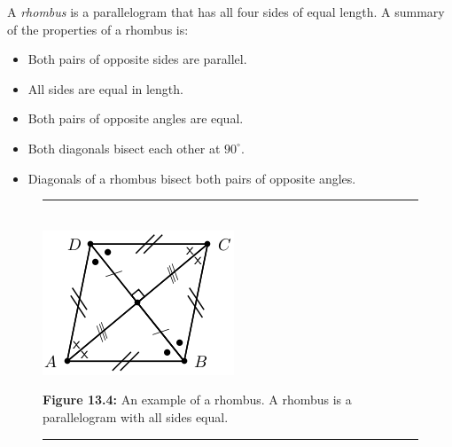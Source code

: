           
          \label{m39354*id319041}A \textsl{rhombus} is a parallelogram that has all four sides of equal length. A summary of the properties of a rhombus is:\par 
          \label{m39354*id319051}\begin{itemize}[noitemsep]
            \label{m39354*uid70}\item Both pairs of opposite sides are parallel.
\label{m39354*uid71}\item All sides are equal in length.
\label{m39354*uid72}\item Both pairs of opposite angles are equal.
\label{m39354*uid73}\item Both diagonals bisect each other at \begin{math}{90}^{\circ }\end{math}.
\label{m39354*uid74}\item Diagonals of a rhombus bisect both pairs of opposite angles.
\end{itemize}
        
          
    \setcounter{subfigure}{0}


	\begin{figure}[H] %
    \begin{center}
    \rule[.1in]{\figurerulewidth}{.005in} \\
        \label{m39354*uid75!!!underscore!!!media}\label{m39354*uid75!!!underscore!!!printimage}\includegraphics{col11306.imgs/m39354_MG10C13_043.png} %
        
      \vspace{2pt}
    \vspace{\rubberspace}\par \begin{cnxcaption}
	  \small \textbf{Figure 13.4: }An example of a rhombus. A rhombus is a parallelogram with all sides equal.
	\end{cnxcaption}
      
    \vspace{.1in}
    \rule[.1in]{\figurerulewidth}{.005in} \\
        
    \end{center}

 \end{figure}   

